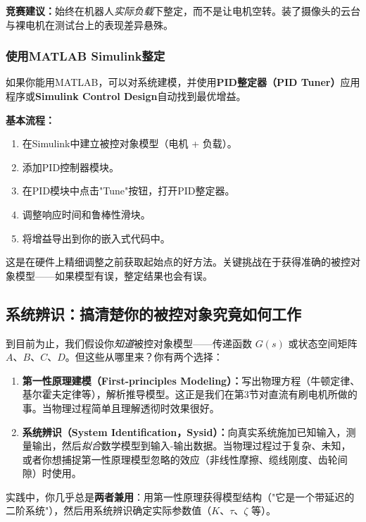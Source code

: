 \textbf{竞赛建议：}始终在机器人\textit{实际负载}下整定，而不是让电机空转。装了摄像头的云台与裸电机在测试台上的表现差异悬殊。

\subsubsection{使用MATLAB Simulink整定}

如果你能用MATLAB，可以对系统建模，并使用\textbf{PID整定器（PID Tuner）}应用程序或\textbf{Simulink Control Design}自动找到最优增益。

\textbf{基本流程：}
\begin{enumerate}
    \item 在Simulink中建立被控对象模型（电机 + 负载）。
    \item 添加PID控制器模块。
    \item 在PID模块中点击"Tune"按钮，打开PID整定器。
    \item 调整响应时间和鲁棒性滑块。
    \item 将增益导出到你的嵌入式代码中。
\end{enumerate}

这是在硬件上精细调整之前获取起始点的好方法。关键挑战在于获得准确的被控对象模型——如果模型有误，整定结果也会有误。

\subsection{系统辨识：搞清楚你的被控对象究竟如何工作}

到目前为止，我们假设你\textit{知道}被控对象模型——传递函数 $G(s)$ 或状态空间矩阵 $A$、$B$、$C$、$D$。但这些从哪里来？你有两个选择：

\begin{enumerate}
    \item \textbf{第一性原理建模（First-principles Modeling）：}写出物理方程（牛顿定律、基尔霍夫定律等），解析推导模型。这正是我们在第3节对直流有刷电机所做的事。当物理过程简单且理解透彻时效果很好。
    \item \textbf{系统辨识（System Identification，Sysid）：}向真实系统施加已知输入，测量输出，然后\textit{拟合}数学模型到输入-输出数据。当物理过程过于复杂、未知，或者你想捕捉第一性原理模型忽略的效应（非线性摩擦、缆线刚度、齿轮间隙）时使用。
\end{enumerate}

实践中，你几乎总是\textbf{两者兼用}：用第一性原理获得模型结构（"它是一个带延迟的二阶系统"），然后用系统辨识确定实际参数值（$K$、$\tau$、$\zeta$ 等）。

